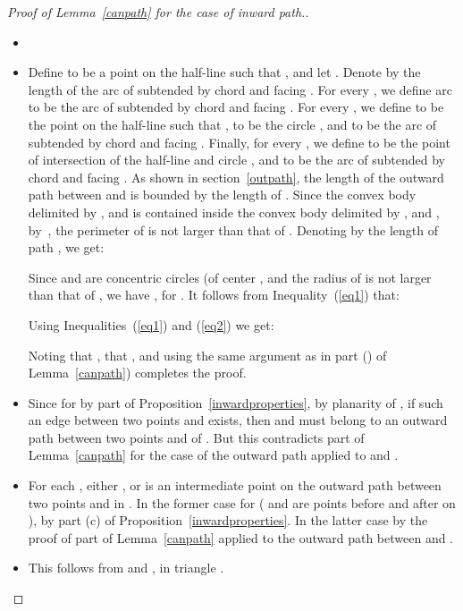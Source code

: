 \documentclass{stacs_proc}
\theoremstyle{plain}\newtheorem{satz}[thm]{Satz}
\begin{document}
\begin{proof}[Proof of Lemma~\ref{canpath} for the case of inward
path.]
\begin{itemize}
\item[]
\item[]


Define  to be a point on the half-line  such that , and let . Denote by  the
length of the arc of  subtended by chord  and
facing . For every , we define
arc  to be the arc of  subtended by
chord  and facing . For every , we define  to be the point on the half-line
 such that ,  to be the circle
, and  to be the arc of 
subtended by chord  and facing .
Finally, for every , we define  to be the
point of intersection of the half-line  and circle ,
and  to be the arc of  subtended by chord
 and facing . As shown in
section~\ref{outpath}, the length of the outward path  between
 and  is bounded by the length of . Since
the convex body  delimited by ,  and 
is contained inside the convex body  delimited by ,
 and , by~\cite{bookconvexity}, the perimeter
of  is not larger than that of . Denoting by  the
length of path , we get:

Since  and  are concentric circles (of center ,
and the radius of  is not larger than that of , we
have , for . It follows
from Inequality~(\ref{eq1}) that:

Using Inequalities~(\ref{eq1}) and (\ref{eq2}) we get:

Noting that , that
, and using the same argument as in
part () of Lemma~\ref{canpath}) completes the proof.

\item[] Since  for  by part  of
Proposition~\ref{inwardproperties}, by planarity of , if such an
edge between two points  and  exists, then  and 
must belong to an outward path between two points  and
 of . But this contradicts part  of
Lemma~\ref{canpath} for the case of the outward path applied to
 and .

\item[] For each , either ,
or  is an intermediate point on the outward path between two
points  and  in . In the former case
 for  ( and  are points
before and after  on ), by part (c) of
Proposition~\ref{inwardproperties}. In the latter case
 by the proof of part
 of Lemma~\ref{canpath} applied to the outward path between
 and .

\item[] This follows from  and
, in triangle
.
\end{itemize}
\end{proof}
\end{document}
